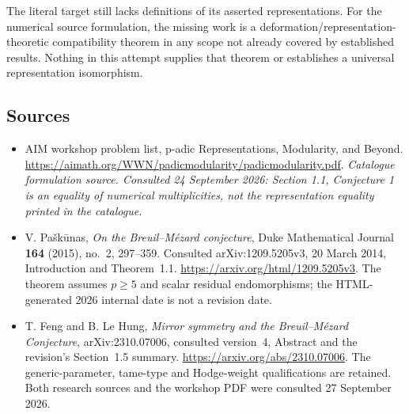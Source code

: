\documentclass[11pt,a4paper]{article}
\numberwithin{equation}{section}
\begin{document}
The literal target still lacks definitions of its asserted
representations. For the numerical source formulation, the missing work
is a deformation/representation-theoretic compatibility theorem in any
scope not already covered by established results. Nothing in this
attempt supplies that theorem or establishes a universal representation
isomorphism.
\subsection{Sources}
\begin{itemize}\raggedright
\item[\textnormal{[S1]}]\hypertarget{source:statement:1}{} AIM workshop problem list, p-adic Representations, Modularity, and Beyond.
\url{https://aimath.org/WWN/padicmodularity/padicmodularity.pdf}.
{\small\textit{Catalogue formulation source. Consulted 24 September 2026: Section 1.1, Conjecture 1 is an equality of numerical multiplicities, not the representation equality printed in the catalogue.}}
\item[\textnormal{[E1]}]\hypertarget{extra:statement:1}{}
V. Pa\v{s}k\=unas, \emph{On the Breuil--M\'ezard conjecture},
Duke Mathematical Journal \textbf{164} (2015), no.~2, 297--359.
Consulted arXiv:1209.5205v3, 20 March 2014, Introduction and
Theorem~1.1. \url{https://arxiv.org/html/1209.5205v3}.
The theorem assumes $p\ge5$ and scalar residual endomorphisms; the
HTML-generated 2026 internal date is not a revision date.
\item[\textnormal{[E2]}]\hypertarget{extra:statement:2}{}
T. Feng and B. Le Hung, \emph{Mirror symmetry and the Breuil--M\'ezard
Conjecture}, arXiv:2310.07006, consulted version~4, Abstract and the
revision's Section~1.5 summary. \url{https://arxiv.org/abs/2310.07006}.
The generic-parameter, tame-type and Hodge-weight qualifications are
retained. Both research sources and the workshop PDF were consulted
27 September 2026.
\end{itemize}
\end{document}
